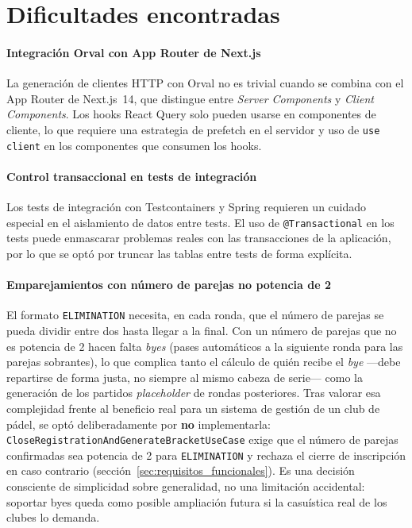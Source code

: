 \section{Dificultades encontradas}
\label{sec:dificultades}

\paragraph{Integración Orval con App Router de Next.js} La generación de clientes
HTTP con Orval no es trivial cuando se combina con el App Router de Next.js~14,
que distingue entre \textit{Server Components} y \textit{Client Components}.
Los hooks React Query solo pueden usarse en componentes de cliente, lo que
requiere una estrategia de prefetch en el servidor y uso de \texttt{use client}
en los componentes que consumen los hooks.

\paragraph{Control transaccional en tests de integración} Los tests de integración
con Testcontainers y Spring requieren un cuidado especial en el aislamiento de
datos entre tests. El uso de \texttt{@Transactional} en los tests puede enmascarar
problemas reales con las transacciones de la aplicación, por lo que se optó por
truncar las tablas entre tests de forma explícita.

\paragraph{Emparejamientos con número de parejas no potencia de 2} El formato
\texttt{ELIMINATION} necesita, en cada ronda, que el número de parejas se
pueda dividir entre dos hasta llegar a la final. Con un número de parejas que
no es potencia de 2 hacen falta \textit{byes} (pases automáticos a la
siguiente ronda para las parejas sobrantes), lo que complica tanto el cálculo
de quién recibe el \textit{bye} —debe repartirse de forma justa, no siempre al
mismo cabeza de serie— como la generación de los partidos \textit{placeholder}
de rondas posteriores. Tras valorar esa complejidad frente al beneficio real
para un sistema de gestión de un club de pádel, se optó deliberadamente por
\textbf{no} implementarla: \texttt{Close\-Registration\-And\-Generate\-Bracket\-Use\-Case}
exige que el número de parejas confirmadas sea potencia de 2 para
\texttt{ELIMINATION} y rechaza el cierre de inscripción en caso contrario
(sección~\ref{sec:requisitos_funcionales}). Es una decisión consciente de
simplicidad sobre generalidad, no una limitación accidental: soportar byes
queda como posible ampliación futura si la casuística real de los clubes lo
demanda.

